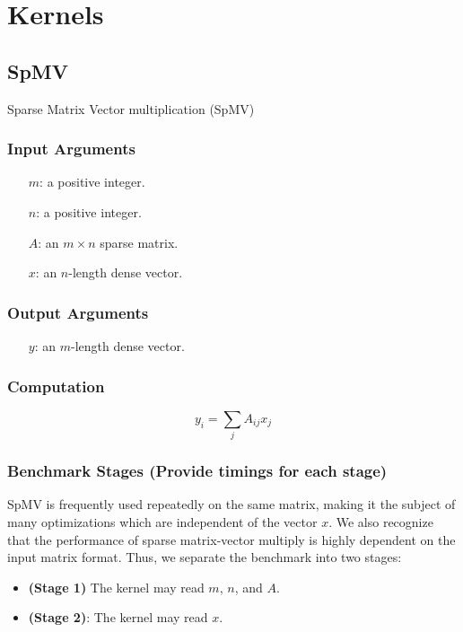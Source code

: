 \documentclass{article}
\begin{document}
\section{Kernels}

\subsection{SpMV}
Sparse Matrix Vector multiplication (SpMV)
\subsubsection{Input Arguments}

\begin{itemize}
	\item[$m$:] a positive integer.
	\item[$n$:] a positive integer.
	\item[$A$:] an $m \times n$ sparse matrix.
	\item[$x$:] an $n$-length dense vector.
\end{itemize}

\subsubsection{Output Arguments}

\begin{itemize}
	\item[$y$:] an $m$-length dense vector.
\end{itemize}

\subsubsection{Computation}

$$y_i = \sum_{j}A_{ij}x_j$$

\subsubsection{Benchmark Stages (Provide timings for each stage)}

SpMV is frequently used repeatedly on the same matrix, making it the
subject of many optimizations which are independent of the vector $x$.  We also recognize that the performance of sparse matrix-vector multiply is highly dependent on the input matrix format. Thus, 
we separate the benchmark into two stages:

\begin{itemize}
\item \textbf{(Stage 1)}
	The kernel may read $m$, $n$, and $A$.
\item \textbf{(Stage 2)}:
	The kernel may read $x$.
\end{itemize}
\end{document}
